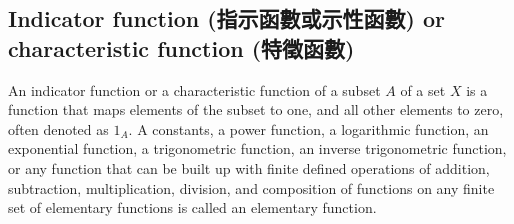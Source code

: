 \documentclass[a4paper,12pt]{article}
\begin{document}
\subsection{Indicator function (指示函數或示性函數) or characteristic function (特徵函數)}
An indicator function or a characteristic function of a subset $A$ of a set $X$ is a function that maps elements of the subset to one, and all other elements to zero, often denoted as $1_A$.
A constants, a power function, a logarithmic function, an exponential function, a trigonometric function, an inverse trigonometric function, or any function that can be built up with finite defined operations of addition, subtraction, multiplication, division, and composition of functions on any finite set of elementary functions is called an elementary function.
\end{document}
